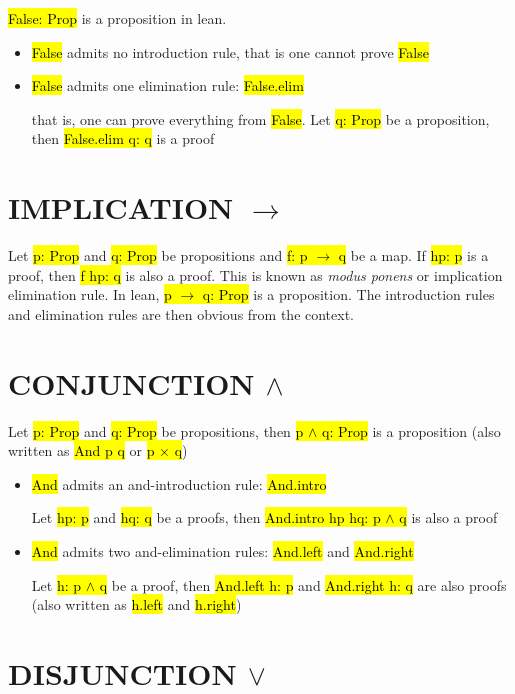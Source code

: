 \hl{False: Prop} is a proposition in lean.

\begin{itemize}
	\item \hl{False} admits no introduction rule, that is one cannot prove \hl{False}
	
	\item \hl{False} admits one elimination rule: \hl{False.elim}
	
	that is, one can prove everything from \hl{False}. Let \hl{q: Prop} be a proposition, then \hl{False.elim q: q} is a proof
\end{itemize}

\section{IMPLICATION $\to$}

Let \hl{p: Prop} and \hl{q: Prop} be propositions and \hl{f: p $\to$ q} be a map. If \hl{hp: p} is a proof, then \hl{f hp: q} is also a proof. This is known as \textit{modus ponens} or implication elimination rule. In lean, \hl{p $\to$ q: Prop} is a proposition. The introduction rules and elimination rules are then obvious from the context.

\section{CONJUNCTION $\land$}

Let \hl{p: Prop} and \hl{q: Prop} be propositions, then \hl{p $\land$ q: Prop} is a proposition (also written as \hl{And p q} or \hl{p $\times$ q})

\begin{itemize}
	\item \hl{And} admits an and-introduction rule: \hl{And.intro}
	
	Let \hl{hp: p} and \hl{hq: q} be a proofs, then \hl{And.intro hp hq: p $\land$ q} is also a proof
	
	\item \hl{And} admits two and-elimination rules: \hl{And.left} and \hl{And.right}
	
	Let \hl{h: p $\land$ q} be a proof, then \hl{And.left h: p} and \hl{And.right h: q} are also proofs (also written as \hl{h.left} and \hl{h.right})
\end{itemize}


\section{DISJUNCTION $\lor$}

